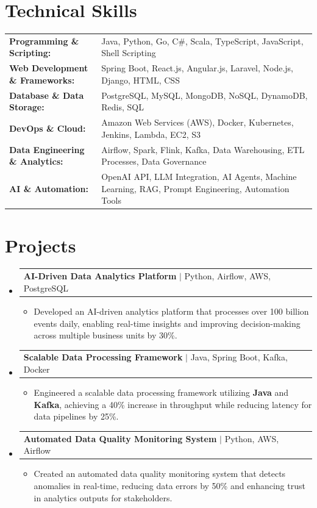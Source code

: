 \documentclass[letterpaper,10pt]{article}
\makeatletter
\newcommand{\resumeItem}[1]{
  \item{\fontsize{8pt}{9pt}\selectfont
    #1 \vspace{-3pt}
  }
}
\newcommand{\resumeProjectHeading}[2]{
    \item
    \begin{tabular*}{1.001\textwidth}{l@{\extracolsep{\fill}}r}
      \fontsize{8.5pt}{10pt}#1 & \textbf{\fontsize{8.5pt}{10pt} #2}\\
    \end{tabular*}\vspace{-7pt}
}
\newcommand{\resumeSubHeadingListStart}{\begin{itemize}[leftmargin=0pt, label={}]}
\newcommand{\resumeSubHeadingListEnd}{\end{itemize}}
\newcommand{\resumeItemListStart}{\begin{itemize}[leftmargin=*]}
\newcommand{\resumeItemListEnd}{\end{itemize}\vspace{-5pt}}
\makeatother
\begin{document}
\section{Technical Skills}
        \vspace{-14pt}
        \begin{table}[h]
            \fontsize{8pt}{9pt}\selectfont
            \begin{tabular}{p{0.3\linewidth} p{0.7\linewidth}}
                \textbf{Programming \& Scripting:} & Java, Python, Go, C\#, Scala, TypeScript, JavaScript, Shell Scripting \\
                \textbf{Web Development \& Frameworks:} & Spring Boot, React.js, Angular.js, Laravel, Node.js, Django, HTML, CSS \\
                \textbf{Database \& Data Storage:} & PostgreSQL, MySQL, MongoDB, NoSQL, DynamoDB, Redis, SQL \\
                \textbf{DevOps \& Cloud:} & Amazon Web Services (AWS), Docker, Kubernetes, Jenkins, Lambda, EC2, S3 \\
                \textbf{Data Engineering \& Analytics:} & Airflow, Spark, Flink, Kafka, Data Warehousing, ETL Processes, Data Governance \\
                \textbf{AI \& Automation:} & OpenAI API, LLM Integration, AI Agents, Machine Learning, RAG, Prompt Engineering, Automation Tools \\
            \end{tabular}
        \end{table}
 \vspace{-18pt}

\section{Projects}
    \vspace{-5pt}
    \resumeSubHeadingListStart
          \resumeProjectHeading
            {\textbf{AI-Driven Data Analytics Platform} $|$ Python, Airflow, AWS, PostgreSQL}{}
            \resumeItemListStart
                \resumeItem{Developed an AI-driven analytics platform that processes over 100 billion events daily, enabling real-time insights and improving decision-making across multiple business units by 30\%.}
            \resumeItemListEnd
        \vspace{-12pt}
    
        \resumeProjectHeading
            {\textbf{Scalable Data Processing Framework} $|$ Java, Spring Boot, Kafka, Docker}{}
        \resumeItemListStart
                \resumeItem{Engineered a scalable data processing framework utilizing \textbf{Java} and \textbf{Kafka}, achieving a 40\% increase in throughput while reducing latency for data pipelines by 25\%.}
        \resumeItemListEnd
      \vspace{-12pt}
      \resumeProjectHeading
        {\textbf{Automated Data Quality Monitoring System} $|$ Python, AWS, Airflow}{}
    \resumeItemListStart
            \resumeItem{Created an automated data quality monitoring system that detects anomalies in real-time, reducing data errors by 50\% and enhancing trust in analytics outputs for stakeholders.}
    \resumeItemListEnd
    \resumeSubHeadingListEnd
\end{document}
